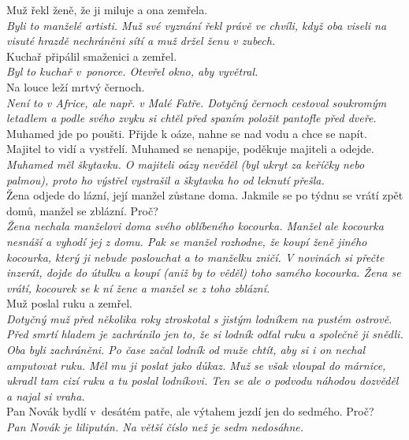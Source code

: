 \begin{multicols}{\value{columnsgames}}
\noindent
Muž řekl ženě, že ji miluje a ona zemřela.\\[1 mm]
{\sl Byli to manželé artisti. Muž své vyznání řekl právě ve chvíli, 
když oba viseli na visuté hrazdě nechráněni sítí a muž držel 
ženu v zubech.}\\

\noindent
Kuchař připálil smaženici a zemřel.\\[1 mm]
{\sl Byl to kuchař v~ponorce. Otevřel okno, aby vyvětral.}\\

\noindent
Na louce leží mrtvý černoch.\\[1 mm]
{\sl Není to v Africe, ale např. v Malé Fatře. Dotyčný černoch 
cestoval soukromým letadlem a podle svého zvyku si chtěl před 
spaním položit pantofle před dveře.}\\

\noindent
Muhamed jde po poušti. Přijde k oáze, nahne se nad vodu 
a chce se napít. Majitel to vidí a vystřelí. Muhamed se nenapije, 
poděkuje majiteli a odejde.\\[1 mm]
{\sl Muhamed měl škytavku. O majiteli oázy nevěděl (byl ukryt 
za keříčky nebo palmou), proto ho výstřel vystrašil a škytavka 
ho od leknutí přešla.}\\

\noindent
Žena odjede do lázní, její manžel zůstane doma. Jakmile se 
po týdnu se vrátí zpět domů, manžel se zblázní. Proč?\\[1 mm]
{\sl Žena nechala manželovi doma svého oblíbeného kocourka. 
Manžel ale kocourka nesnáší a vyhodí jej z domu. Pak se manžel 
rozhodne, že koupí ženě jiného kocourka, který ji nebude poslouchat 
a to manželku zničí. V novinách si přečte inzerát, dojde do útulku 
a koupí (aniž by to věděl) toho samého kocourka. Žena se vrátí, 
kocourek se k ní žene a manžel se z toho zblázní.}\\

\noindent
Muž poslal ruku a zemřel.\\[1 mm]
{\sl Dotyčný muž před několika roky ztroskotal s jistým lodníkem 
na pustém ostrově. Před smrtí hladem je zachránilo jen to, že 
si lodník odťal ruku a společně ji snědli. Oba byli zachráněni. 
Po čase začal lodník od muže chtít, aby si i on nechal amputovat 
ruku. Měl mu ji poslat jako důkaz. Muž se však vloupal do márnice, 
ukradl tam cizí ruku a tu poslal lodníkovi. Ten se ale o podvodu 
náhodou dozvěděl a najal si vraha.}\\

\noindent
Pan Novák bydlí v~desátém patře, ale výtahem jezdí 
jen do sedmého. Proč?\\[1 mm]
{\sl Pan Novák je lilipután. Na větší číslo než je sedm
nedosáhne.}\\


\end{multicols}

